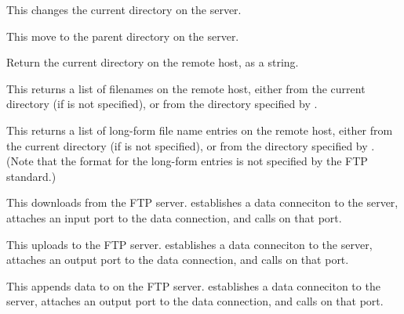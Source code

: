 \begin{desc}
  This changes the current directory on the server.
\end{desc}

\begin{desc}
  This move to the parent directory on the server.
\end{desc}

\begin{desc}
  Return the current directory on the remote host, as a string.
\end{desc}

\begin{desc}
  This returns a list of filenames on the remote host, either from the
  current directory (if  is not specified), or from the
  directory specified by .
\end{desc}

\begin{desc}
  This returns a list of long-form file name entries on the remote
  host, either from the current directory (if  is not
  specified), or from the directory specified by .  (Note
  that the format for the long-form entries is not specified by the
  FTP standard.)
\end{desc}

\begin{desc}
  This downloads  from the FTP server.
   establishes a data conneciton to the server, attaches
  an input port to the data connection, and calls  on that
  port.
\end{desc}

\begin{desc}
  This uploads  to the FTP server.  
  establishes a data conneciton to the server, attaches an output port
  to the data connection, and calls  on that port.
\end{desc}

\begin{desc}
  This appends data to  on the FTP server.
   establishes a data conneciton to the server,
  attaches an output port to the data connection, and calls 
  on that port.
\end{desc}


